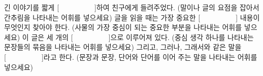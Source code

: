 \documentclass[fs11,seriesFre]{korfarm-base}
\begin{document}
\clearpage

\begin{kfChapterAreaList}
\end{kfChapterAreaList}



\kfActivityBg \par{}\par\nopagebreak[4]\smallskip\nopagebreak[4]
\begin{kfBlankList}
\kfBlankItem 긴 이야기를 짧게 [　　　　　]하여 친구에게 들려주었다. (말이나 글의 요점을 잡아서 간추림을 나타내는 어휘를 넣으세요)
\kfBlankItem 글을 읽을 때는 가장 중요한 [　　　　　] 내용이 무엇인지 찾아야 한다. (사물의 가장 중심이 되는 중요한 부분을 나타내는 어휘를 넣으세요)
\kfBlankItem 이 글은 세 개의 [　　　　　]으로 이루어져 있다. (중심 생각 하나를 나타내는 문장들의 묶음을 나타내는 어휘를 넣으세요)
\kfBlankItem 그리고, 그러나, 그래서와 같은 말을 [　　　　　]라고 한다. (문장과 문장, 단어와 단어를 이어 주는 말을 나타내는 어휘를 넣으세요)
\end{kfBlankList}

\end{document}
